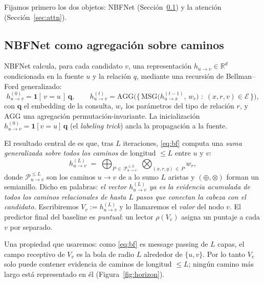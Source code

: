 \documentclass[11pt]{article}
\theoremstyle{plain}
\theoremstyle{definition}
\newcommand{\R}{\mathbb{R}}
\newcommand{\Msg}{\mathrm{MSG}}
\newcommand{\Agg}{\mathrm{AGG}}
\begin{document}
Fijamos primero los dos objetos: NBFNet (Sección~\ref{sec:nbfnet}) y la atención
(Sección~\ref{sec:attn}).

\subsection{NBFNet como agregación sobre caminos}
\label{sec:nbfnet}

NBFNet calcula, para cada candidato $v$, una representación $h_{u\to v}\in\R^{d}$ condicionada en la
fuente $u$ y la relación $q$, mediante una recursión de Bellman--Ford generalizado:
\begin{equation}
\label{eq:bf}
h^{(0)}_{u\to v} = \mathbf{1}[\,v=u\,]\,\boldsymbol{q},
\qquad
h^{(t)}_{u\to v} = \Agg\!\Big(\big\{\,\Msg\big(h^{(t-1)}_{u\to x},\, w_{r}\big)
\;:\; (x,r,v)\in\mathcal{E}\,\big\}\Big),
\end{equation}
con $\boldsymbol q$ el embedding de la consulta, $w_r$ los parámetros del tipo de relación $r$, y
$\Agg$ una agregación permutación-invariante. La inicialización $h^{(0)}_{u\to v}=\mathbf{1}[v=u]\,\boldsymbol q$
(el \emph{labeling trick}) ancla la propagación a la fuente.

El resultado central de \cite{nbfnet} es que, tras $L$ iteraciones, \eqref{eq:bf} computa una
\emph{suma generalizada sobre todos los caminos} de longitud $\le L$ entre $u$ y $v$:
\begin{equation}
\label{eq:pathsum}
h^{(L)}_{u\to v}
\;=\;
\bigoplus_{P\,\in\,\mathcal{P}^{\le L}_{u\to v}}\;
\bigotimes_{(x,r,y)\,\in\,P} w_{r},
\end{equation}
donde $\mathcal{P}^{\le L}_{u\to v}$ son los caminos $u\to v$ de a lo sumo $L$ aristas y
$(\oplus,\otimes)$ forman un semianillo. Dicho en palabras: \emph{el vector $h^{(L)}_{u\to v}$ ya es la
evidencia acumulada de todos los caminos relacionales de hasta $L$ pasos que conectan la cabeza con el
candidato.} Escribiremos $V_v := h^{(L)}_{u\to v}$ y lo llamaremos el \emph{valor} del nodo $v$. El
predictor final del baseline es \emph{puntual}: un lector $\rho(V_v)$ asigna un puntaje a cada $v$ por
separado.

Una propiedad que usaremos: como \eqref{eq:bf} es message passing de $L$ capas, el campo receptivo de
$V_v$ es la bola de radio $L$ alrededor de $\{u,v\}$. Por lo tanto $V_v$ solo puede contener evidencia
de caminos de longitud $\le L$; ningún camino más largo está representado en él
(Figura~\ref{fig:horizon}).
\end{document}
